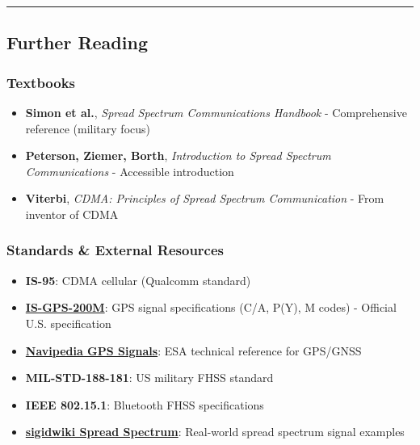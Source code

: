 \begin{center}\rule{0.5\linewidth}{0.5pt}\end{center}

\subsection{\texorpdfstring{ Further
Reading}{ Further Reading}}\label{further-reading}

\subsubsection{Textbooks}\label{textbooks}

\begin{itemize}
\tightlist
\item
  \textbf{Simon et al.}, \emph{Spread Spectrum Communications Handbook}
  - Comprehensive reference (military focus)
\item
  \textbf{Peterson, Ziemer, Borth}, \emph{Introduction to Spread
  Spectrum Communications} - Accessible introduction
\item
  \textbf{Viterbi}, \emph{CDMA: Principles of Spread Spectrum
  Communication} - From inventor of CDMA
\end{itemize}

\subsubsection{Standards \& External
Resources}\label{standards-external-resources}

\begin{itemize}
\tightlist
\item
  \textbf{IS-95}: CDMA cellular (Qualcomm standard)
\item
  \textbf{\href{https://www.gps.gov/technical/icwg/IS-GPS-200M.pdf}{IS-GPS-200M}}:
  GPS signal specifications (C/A, P(Y), M codes) - Official U.S.
  specification
\item
  \textbf{\href{https://gssc.esa.int/navipedia/index.php?title=GPS_Signal_Plan}{Navipedia
  GPS Signals}}: ESA technical reference for GPS/GNSS
\item
  \textbf{MIL-STD-188-181}: US military FHSS standard
\item
  \textbf{IEEE 802.15.1}: Bluetooth FHSS specifications
\item
  \textbf{\href{https://www.sigidwiki.com/wiki/Category:Spread_Spectrum}{sigidwiki
  Spread Spectrum}}: Real-world spread spectrum signal examples
\end{itemize}

